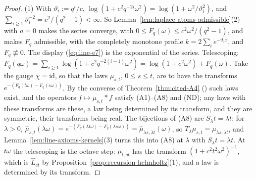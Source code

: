 \begin{proof}
\leanok
{}
(1) With $\vartheta_i := q^i/c$, $\log(1 + c^2q^{-2i}\omega^2) = \log(1 + \omega^2/\vartheta_i^2)$,
and $\sum_{i \ge 1}\vartheta_i^{-2} = c^2/(q^2 - 1) < \infty$. So
Lemma~\ref{lem:laplace-atoms-admissible}(2) with $a = 0$ makes the series converge, with
$0 \le F_q(\omega) \le c^2\omega^2/(q^2 - 1)$, and makes $F_q$ admissible, with the completely
monotone profile $k = 2\sum_ie^{-\vartheta_ix}$, and $F_q \not\equiv 0$. The display (\ref{eq:line-e7}) is
the exponential of the series. Telescoping:
$F_q(q\omega) = \sum_{i \ge 1}\log(1 + c^2q^{-2(i-1)}\omega^2) = \log(1 + c^2\omega^2) + F_q(\omega)$.
Take the gauge $\chi = \mathrm{id}$, so that the laws $\mu_{s,t}$, $0 \le s \le t$, are to have the
transforms $e^{-(F_q(t\omega) - F_q(s\omega))}$. By the converse of Theorem~\ref{thm:cited-A4}
() such laws exist, and the operators $f \mapsto \mu_{s,t} * f$
satisfy (A1)--(A8) and (ND); any laws with these transforms are these, a law being determined by its
transform, and they are symmetric, their transforms being real. The bijections of (A8) are
$S_\lambda t = \lambda t$: for $\lambda > 0$,
$\widehat\mu_{s,t}(\lambda\omega) = e^{-(F_q(\lambda t\omega) - F_q(\lambda s\omega))} =
\widehat\mu_{\lambda s,\lambda t}(\omega)$, so $T_\lambda\mu_{s,t} = \mu_{\lambda s,\lambda t}$, and
Lemma~\ref{lem:line-axioms-kernels}(3) turns this into (A8) at $\lambda$ with
$S_\lambda t = \lambda t$. At $t\omega$ the
telescoping is the octave step: $\mu_{t,qt}$ has the transform $(1 + c^2t^2\omega^2)^{-1}$, which
is $\widehat L_{ct}$ by Proposition~\ref{prop:recursion-helmholtz}(1), and a law is determined by
its transform.


\end{proof}
